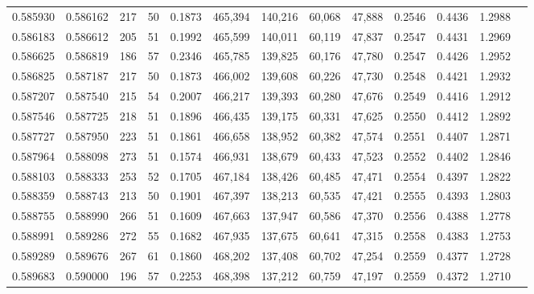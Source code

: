 \begin{tabular}{rrrrrrrrrrrrr}
0.585930 & 0.586162 &    217 &    50 &                                     0.1873 & 465,394 & 140,216 &  60,068 &  47,888 & 0.2546 & 0.4436 & 1.2988 \\
0.586183 & 0.586612 &    205 &    51 &                                     0.1992 & 465,599 & 140,011 &  60,119 &  47,837 & 0.2547 & 0.4431 & 1.2969 \\
0.586625 & 0.586819 &    186 &    57 &                                     0.2346 & 465,785 & 139,825 &  60,176 &  47,780 & 0.2547 & 0.4426 & 1.2952 \\
0.586825 & 0.587187 &    217 &    50 &                                     0.1873 & 466,002 & 139,608 &  60,226 &  47,730 & 0.2548 & 0.4421 & 1.2932 \\
0.587207 & 0.587540 &    215 &    54 &                                     0.2007 & 466,217 & 139,393 &  60,280 &  47,676 & 0.2549 & 0.4416 & 1.2912 \\
0.587546 & 0.587725 &    218 &    51 &                                     0.1896 & 466,435 & 139,175 &  60,331 &  47,625 & 0.2550 & 0.4412 & 1.2892 \\
0.587727 & 0.587950 &    223 &    51 &                                     0.1861 & 466,658 & 138,952 &  60,382 &  47,574 & 0.2551 & 0.4407 & 1.2871 \\
0.587964 & 0.588098 &    273 &    51 &                                     0.1574 & 466,931 & 138,679 &  60,433 &  47,523 & 0.2552 & 0.4402 & 1.2846 \\
0.588103 & 0.588333 &    253 &    52 &                                     0.1705 & 467,184 & 138,426 &  60,485 &  47,471 & 0.2554 & 0.4397 & 1.2822 \\
0.588359 & 0.588743 &    213 &    50 &                                     0.1901 & 467,397 & 138,213 &  60,535 &  47,421 & 0.2555 & 0.4393 & 1.2803 \\
0.588755 & 0.588990 &    266 &    51 &                                     0.1609 & 467,663 & 137,947 &  60,586 &  47,370 & 0.2556 & 0.4388 & 1.2778 \\
0.588991 & 0.589286 &    272 &    55 &                                     0.1682 & 467,935 & 137,675 &  60,641 &  47,315 & 0.2558 & 0.4383 & 1.2753 \\
0.589289 & 0.589676 &    267 &    61 &                                     0.1860 & 468,202 & 137,408 &  60,702 &  47,254 & 0.2559 & 0.4377 & 1.2728 \\
0.589683 & 0.590000 &    196 &    57 &                                     0.2253 & 468,398 & 137,212 &  60,759 &  47,197 & 0.2559 & 0.4372 & 1.2710 \\

\end{tabular}

